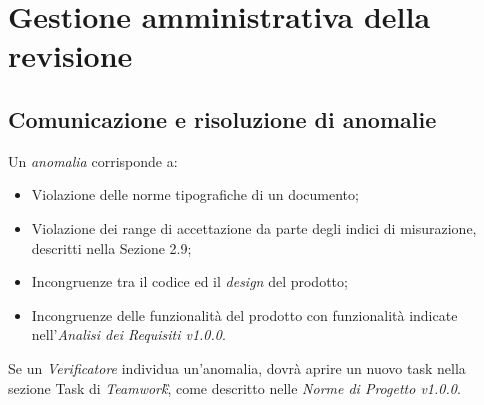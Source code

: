 \section{Gestione amministrativa della revisione}

\subsection{Comunicazione e risoluzione di anomalie}

Un \textit{anomalia} corrisponde a:

\begin{itemize}
	\item Violazione delle norme tipografiche di un documento;
	\item Violazione dei range di accettazione da parte degli indici di misurazione, descritti nella Sezione 2.9;
	\item Incongruenze tra il codice ed il \textit{design} del prodotto;
	\item Incongruenze delle funzionalità del prodotto con funzionalità 
	indicate nell'\textit{Analisi dei Requisiti v1.0.0}.
\end{itemize}
Se un \textit{Verificatore} individua un'anomalia, dovrà aprire un nuovo task 
nella sezione Task di \textit{Teamwork}\G, come descritto nelle 
\textit{Norme di Progetto v1.0.0}.

\newpage